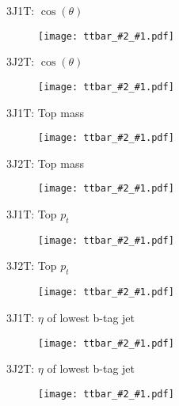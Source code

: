 \documentclass[utf8]{beamer}
\newcommand{\plot}[3]{
	\begin{frame}{#2: #3}
		\begin{figure}[htb]
			\center
			\texttt{[image: ttbar\_\#2\_\#1.pdf]}
		\end{figure}
	\end{frame}
}
\begin{document}
\plot{costheta}{3J1T}{$\cos(\theta)$}
\plot{costheta}{3J2T}{$\cos(\theta)$}

\plot{topmass}{3J1T}{Top mass}
\plot{topmass}{3J2T}{Top mass}

\plot{toppt}{3J1T}{Top $p_t$}
\plot{toppt}{3J2T}{Top $p_t$}

\plot{bjeteta}{3J1T}{$\eta$ of lowest b-tag jet}
\plot{bjeteta}{3J2T}{$\eta$ of lowest b-tag jet}
\end{document}
